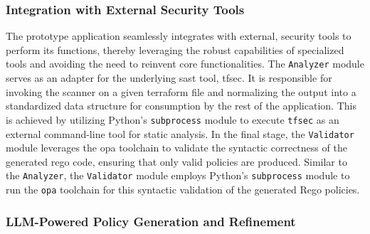 \subsubsection{Integration with External Security Tools}
The prototype application seamlessly integrates with external, security tools to perform its functions, thereby leveraging the robust capabilities of specialized tools and avoiding the need to reinvent core functionalities. The \texttt{Analyzer} module serves as an adapter for the underlying \gls{sast} tool, tfsec. It is responsible for invoking the scanner on a given \gls{terraform} file and normalizing the output into a standardized data structure for consumption by the rest of the application. This is achieved by utilizing Python's \texttt{subprocess} module to execute \texttt{tfsec} as an external command-line tool for static analysis. In the final stage, the \texttt{Validator} module leverages the \gls{opa} toolchain to validate the syntactic correctness of the generated \gls{rego} code, ensuring that only valid policies are produced. Similar to the \texttt{Analyzer}, the \texttt{Validator} module employs Python's \texttt{subprocess} module to run the \texttt{opa} toolchain for this syntactic validation of the generated Rego policies.

\subsubsection{LLM-Powered Policy Generation and Refinement}

